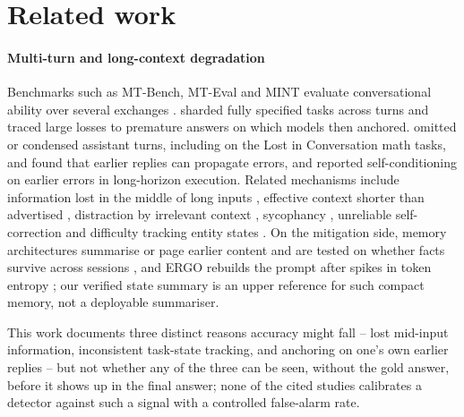 \section{Related work}
\label{sec:related}

\paragraph{Multi-turn and long-context degradation}
Benchmarks such as MT-Bench, MT-Eval and MINT evaluate conversational ability
over several exchanges \citep{zheng2023judging,kwan2024mteval,wang2024mint}.
\citet{laban2025lost} sharded fully specified tasks across turns and traced
large losses to premature answers on which models then anchored.
\citet{huang2026benefit} omitted or condensed assistant turns, including on the
Lost in Conversation math tasks, and found that earlier replies can propagate
errors, and \citet{sinha2025illusion} reported self-conditioning on earlier
errors in long-horizon execution. Related mechanisms include information lost
in the middle of long inputs \citep{liu2024lost}, effective context shorter
than advertised \citep{hsieh2024ruler}, distraction by irrelevant context
\citep{shi2023distracted}, sycophancy \citep{sharma2024sycophancy}, unreliable
self-correction \citep{huang2024cannot} and difficulty tracking entity states
\citep{kim2023entity}. On the mitigation side, memory architectures summarise
or page earlier content and are tested on whether facts survive across
sessions \citep{packer2023memgpt,zhong2024memorybank,wang2023recursive,
maharana2024locomo,wu2025longmemeval}, and ERGO rebuilds the prompt after
spikes in token entropy \citep{khalid2025ergo}; our verified state summary is
an upper reference for such compact memory, not a deployable summariser.

This work documents three distinct reasons accuracy might fall -- lost
mid-input information, inconsistent task-state tracking, and anchoring on
one's own earlier replies -- but not whether any of the three can be seen,
without the gold answer, before it shows up in the final answer; none of the
cited studies calibrates a detector against such a signal with a controlled
false-alarm rate.


